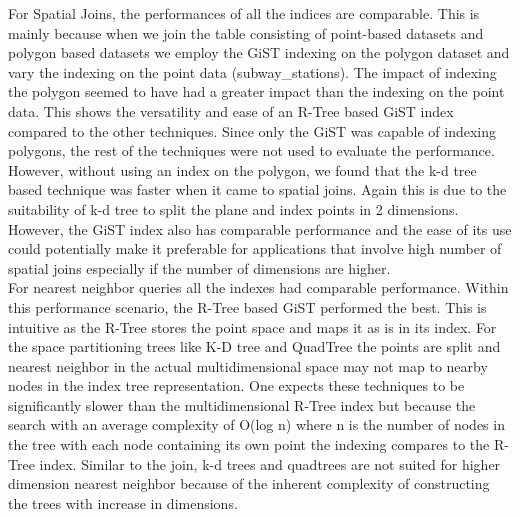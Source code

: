 \documentclass{sig-alternate-05-2015}
\begin{document}
For Spatial Joins, the performances of all the indices are comparable. This is mainly because when we join the table consisting of point-based datasets and polygon based datasets we employ the GiST indexing on the polygon dataset and vary the indexing on the point data (subway_stations). The impact of indexing the polygon seemed to have had a greater impact than the indexing on the point data. This shows the versatility and ease of an R-Tree based GiST index compared to the other techniques. Since only the GiST was capable of indexing polygons, the rest of the techniques were not used to evaluate the performance. However, without using an index on the polygon, we found that the k-d tree based technique was faster when it came to spatial joins. Again this is due to the suitability of k-d tree to split the plane and index points in 2 dimensions. However, the GiST index also has comparable performance and the ease of its use could potentially make it preferable for applications that involve high number of spatial joins especially if the number of dimensions are higher. \\

For nearest neighbor queries all the indexes had comparable performance. Within this performance scenario, the R-Tree based GiST performed the best. This is intuitive as the R-Tree stores the point space and maps it as is in its index. For the space partitioning trees like K-D tree and QuadTree the points are split and nearest neighbor in the actual multidimensional space may not map to nearby nodes in the index tree representation. One expects these techniques to be significantly slower than the multidimensional R-Tree index but because the search with an average complexity of O(log n) where n is the number of nodes in the tree with each node containing its own point the indexing compares to the R-Tree index. Similar to the join, k-d trees and quadtrees are not suited for higher dimension nearest neighbor because of the inherent complexity of constructing the trees with increase in dimensions.  
\end{document}
